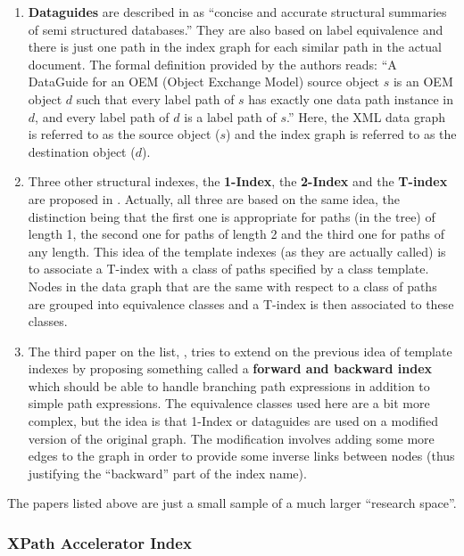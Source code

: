 \documentclass[a4paper,10pt]{article}
\begin{document}
\begin{enumerate}

\item \textbf{Dataguides} are described in \cite{gol00} as ``concise and accurate structural
summaries of semi structured databases.'' They are also based on label equivalence and there is
just one path in the index graph for each similar path in the actual document. The formal definition
provided by the authors reads: ``A DataGuide for an OEM (Object Exchange Model) source object $s$
is an OEM object $d$ such that every label path of $s$ has exactly one data path instance in $d$, and
every label path of $d$ is a label path of $s$.'' Here, the XML data graph is referred to as the source
object ($s$) and the index graph is referred to as the destination object ($d$).

\item Three other structural indexes, the \textbf{1-Index}, the \textbf{2-Index} and the \textbf{T-index}
are proposed in \cite{mil97}. Actually, all three are based on the same idea, the distinction being that the
first one is appropriate for paths (in the tree) of length 1, the second one for paths of length 2 and the
third one for paths of any length. This idea of the template indexes (as they are actually called) is to
associate a T-index with a class of paths specified by a class template. Nodes in the data graph that are
the same with respect to a class of paths are grouped into equivalence classes and a T-index is then
associated to these classes.

\item The third paper on the list, \cite{kau02}, tries to extend on the previous idea of template indexes
by proposing something called a \textbf{forward and backward index} which should be able to handle
branching path expressions in addition to simple path expressions. The equivalence classes used here
are a bit more complex, but the idea is that 1-Index or dataguides are used on a modified version of the
original graph. The modification involves adding some more edges to the graph in order to provide some
inverse links between nodes (thus justifying the ``backward'' part of the index name).

\end{enumerate}

The papers listed above are just a small sample of a much larger ``research space''.

\subsubsection*{XPath Accelerator Index}
\end{document}
